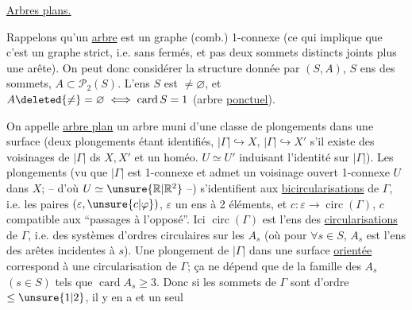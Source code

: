 \uline{Arbres plans.}\hfill{}

Rappelons qu'un \uline{arbre} est un graphe (comb.) 1-connexe (ce qui implique que c'est un graphe strict, i.e. sans  fermés, et pas deux  sommets distincts joints  plus une arête). On peut donc considérer la structure donnée par $(S,A)$, $S$ ens des sommets, $A\subset\mathcal P_2(S)$.  L'ens $S$ est $\ne\varnothing$, et $A\deleted{\ne}=\varnothing\iff\operatorname{card}S=1$ (arbre \uline{ponctuel}).

On appelle \uline{arbre plan} un arbre muni d'une classe de plongements dans une surface (deux plongements étant identifiés, $|\Gamma|\hookrightarrow X$, $|\Gamma|\hookrightarrow X'$ s'il existe des voisinages de $|\Gamma|$ ds $X,X'$ et un homéo. $U\simeq U'$ induisant l'identité sur $|\Gamma|$). Les  plongements (vu que $|\Gamma|$ est 1-connexe et admet un voisinage ouvert 1-connexe $U$ dans $X$; -- d'où $U\simeq\unsure{\mathbb R|\mathbb R^2}$ --) s'identifient aux \uline{bicircularisations} de $\Gamma$, i.e. les  paires $(\varepsilon,\unsure{c|\varphi})$, $\varepsilon$ un ens à 2 éléments,  et $c:\varepsilon\longrightarrow\operatorname{circ}(\Gamma)$, $c$ compatible aux ``passages à l'opposé''. Ici $\operatorname{circ}(\Gamma)$ est l'ens des \uline{circularisations} de $\Gamma$, i.e. des systèmes d'ordres circulaires sur les $A_s$ (où pour $\forall s\in S$, $A_s$ est l'ens des arêtes incidentes à $s$). Une  plongement de $|\Gamma|$ dans une surface \uline{orientée} correspond à une circularisation de $\Gamma$; ça ne dépend que de la famille des $A_s$ $(s\in S)$ tels que $\operatorname{card}A_s\geq3$. Donc si les sommets de $\Gamma$ sont d'ordre $\leq\unsure{1|2}$, il y en a  et un seul

